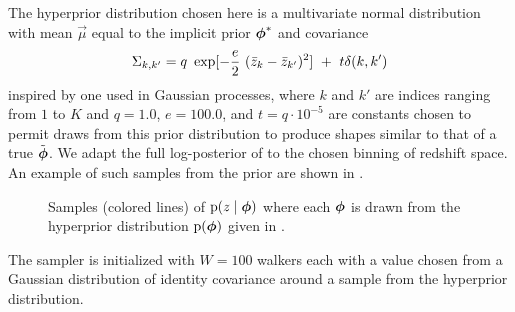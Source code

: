 The hyperprior distribution chosen here is a multivariate normal distribution with mean $\vec{\mu}$ equal to the implicit prior ${\boldsymbol{\phi}}^{*}$ and covariance
\begin{equation}
\eqlabel{eqn:priorcov}
\Sigma_{k,k'} = q\ \exp[-\frac{e}{2}\ (\bar{z}_{k}-\bar{z}_{k'})^{2}]\ +\ t\delta(k,k')
\end{equation}
inspired by one used in Gaussian processes, where $k$ and $k'$ are indices ranging from $1$ to $K$ and $q=1.0$, $e=100.0$, and $t=q\cdot10^{-5}$ are constants chosen to permit draws from this prior distribution to produce shapes similar to that of a true $\tilde{{\boldsymbol{\phi}}}$.  
We adapt the full log-posterior of  to the chosen binning of redshift space.
An example of such samples from the prior are shown in .

\begin{figure}
	\caption{
		Samples (colored lines) of $\mathrm{p}(z \mid {\ensuremath{\boldsymbol{\phi}}})$ where each ${\boldsymbol{\phi}}$ is drawn from the hyperprior distribution $\mathrm{p}({\boldsymbol{\phi}})$ given in .}
\end{figure}

The sampler is initialized with $W=100$ walkers each with a value chosen from a Gaussian distribution of identity covariance around a sample from the hyperprior distribution.  


%



